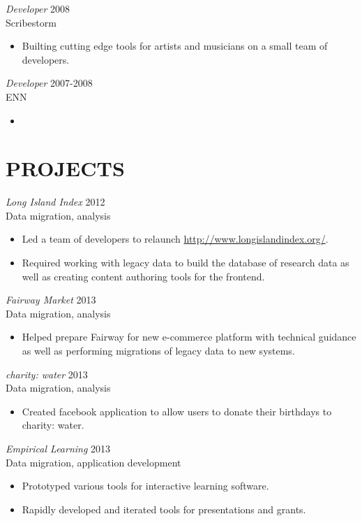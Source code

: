 \documentclass[line,margin]{res}
\begin{document}
\begin{resume}
    {\sl Developer}
    \hfill 2008 \\
    Scribestorm
    \begin{itemize}
        \item
            Builting cutting edge tools for artists and musicians on a small team
            of developers.
    \end{itemize}

    {\sl Developer}
    \hfill 2007-2008 \\
    ENN
    \begin{itemize}
        \item

    \end{itemize}

\section{PROJECTS}
    {\sl Long Island Index}
    \hfill 2012 \\
    Data migration, analysis
    \begin{itemize} \itemsep -2pt
        \item
            Led a team of developers to relaunch \url{http://www.longislandindex.org/}.
        \item
            Required working with legacy data to build the database of research data as
            well as creating content authoring tools for the frontend.
    \end{itemize}

    {\sl Fairway Market}
    \hfill 2013 \\
    Data migration, analysis
    \begin{itemize} \itemsep -2pt
        \item
            Helped prepare Fairway for new e-commerce platform with technical guidance as well as
            performing migrations of legacy data to new systems.
    \end{itemize}

    {\sl charity: water}
    \hfill 2013 \\
    Data migration, analysis
    \begin{itemize} \itemsep -2pt
        \item
            Created facebook application to allow users to donate their birthdays to charity: water.
    \end{itemize}

    \begin{samepage}
    {\sl Empirical Learning}
    \hfill 2013 \\
    Data migration, application development
    \begin{itemize} \itemsep -2pt
        \item
            Prototyped various tools for interactive learning software.
        \item
            Rapidly developed and iterated tools for presentations and grants.
    \end{itemize}
    \end{samepage}


\end{resume}
\end{document}
